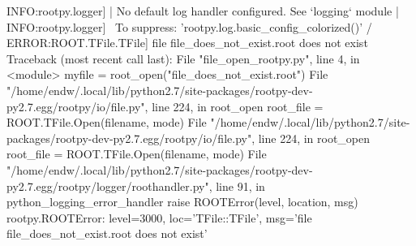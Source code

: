 \begin{footnotesize}
\begin{pyglist}[language=text,texcl=true,abovecaptionskip=0,style=bw]
INFO:rootpy.logger] | No default log handler configured. See `logging` module |
INFO:rootpy.logger] \    To suppress: 'rootpy.log.basic_config_colorized()'   /
ERROR:ROOT.TFile.TFile] file file_does_not_exist.root does not exist
Traceback (most recent call last):
  File "file_open_rootpy.py", line 4, in <module>
    myfile = root_open("file_does_not_exist.root")
  File "/home/endw/.local/lib/python2.7/site-packages/rootpy-dev-py2.7.egg/rootpy/io/file.py", line 224, in root_open
    root_file = ROOT.TFile.Open(filename, mode)
  File "/home/endw/.local/lib/python2.7/site-packages/rootpy-dev-py2.7.egg/rootpy/io/file.py", line 224, in root_open
    root_file = ROOT.TFile.Open(filename, mode)
  File "/home/endw/.local/lib/python2.7/site-packages/rootpy-dev-py2.7.egg/rootpy/logger/roothandler.py", line 91, in python_logging_error_handler
    raise ROOTError(level, location, msg)
rootpy.ROOTError: level=3000, loc='TFile::TFile', msg='file file_does_not_exist.root does not exist'
\end{pyglist}
\end{footnotesize}
